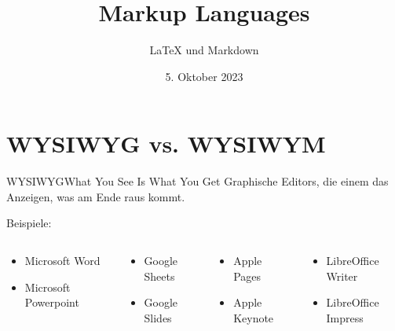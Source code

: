 \documentclass{setbeamer}
\title{Markup Languages}
\subtitle{\LaTeX{} und Markdown}
\institute{\theChairName\\\theDepartmentName\\\theUniversityName}
\date[05.10.2023]{5. Oktober 2023}
\begin{document}
\maketitle



\section{WYSIWYG vs. WYSIWYM}
\begin{frame}{WYSIWYG}{What You See Is What You Get}
    Graphische Editors, die einem das Anzeigen, was am Ende raus kommt.

    \pause
    Beispiele:
    \begin{columns}
        \begin{column}{0.25\textwidth}
            \begin{itemize}
                \item Microsoft Word
                \item Microsoft Powerpoint
            \end{itemize}
        \end{column}

        \begin{column}{0.25\textwidth}
            \begin{itemize}
                \item Google Sheets
                \item Google Slides
            \end{itemize}
        \end{column}

        \begin{column}{0.25\textwidth}
            \begin{itemize}
                \item Apple Pages
                \item Apple Keynote
            \end{itemize}
        \end{column}

        \begin{column}{0.25\textwidth}
            \begin{itemize}
                \item LibreOffice Writer
                \item LibreOffice Impress
            \end{itemize}
        \end{column}
    \end{columns}


\end{frame}
\end{document}
